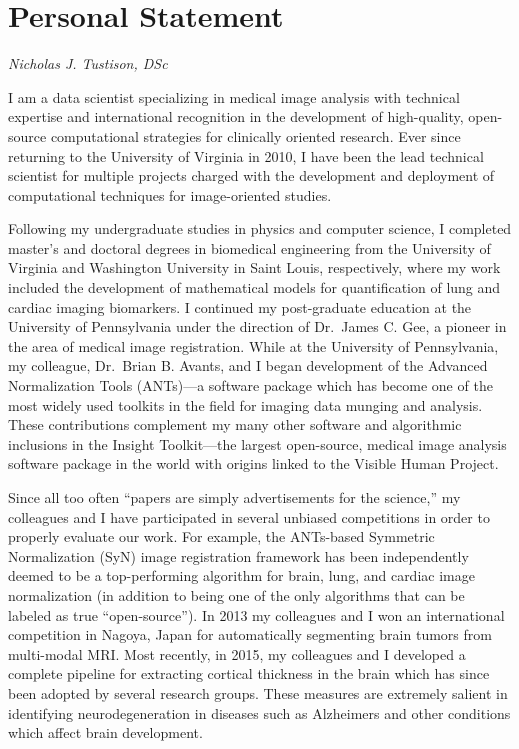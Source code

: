 \documentclass[12pt,]{article}
\title{}
\author{}
\date{}
\begin{document}
\maketitle


\section{Personal Statement}\label{personal-statement}

\emph{Nicholas J. Tustison, DSc}

I am a data scientist specializing in medical image analysis with
technical expertise and international recognition in the development of
high-quality, open-source computational strategies for clinically
oriented research. Ever since returning to the University of Virginia in
2010, I have been the lead technical scientist for multiple projects
charged with the development and deployment of computational techniques
for image-oriented studies.

Following my undergraduate studies in physics and computer science, I
completed master's and doctoral degrees in biomedical engineering from
the University of Virginia and Washington University in Saint Louis,
respectively, where my work included the development of mathematical
models for quantification of lung and cardiac imaging biomarkers. I
continued my post-graduate education at the University of Pennsylvania
under the direction of Dr.~James C. Gee, a pioneer in the area of
medical image registration. While at the University of Pennsylvania, my
colleague, Dr.~Brian B. Avants, and I began development of the Advanced
Normalization Tools (ANTs)---a software package which has become one of
the most widely used toolkits in the field for imaging data munging and
analysis. These contributions complement my many other software and
algorithmic inclusions in the Insight Toolkit---the largest open-source,
medical image analysis software package in the world with origins linked
to the Visible Human Project.

Since all too often ``papers are simply advertisements for the
science,'' my colleagues and I have participated in several unbiased
competitions in order to properly evaluate our work. For example, the
ANTs-based Symmetric Normalization (SyN) image registration framework
has been independently deemed to be a top-performing algorithm for
brain, lung, and cardiac image normalization (in addition to being one
of the only algorithms that can be labeled as true ``open-source''). In
2013 my colleagues and I won an international competition in Nagoya,
Japan for automatically segmenting brain tumors from multi-modal MRI.
Most recently, in 2015, my colleagues and I developed a complete
pipeline for extracting cortical thickness in the brain which has since
been adopted by several research groups. These measures are extremely
salient in identifying neurodegeneration in diseases such as Alzheimers
and other conditions which affect brain development.
\end{document}
